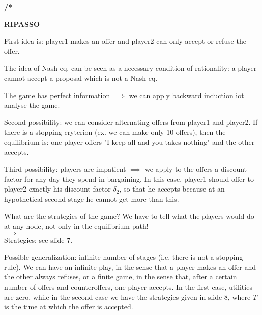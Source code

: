 
%



\bigskip
\noindent \textbf{/*}

\noindent \textbf{RIPASSO}

\noindent First idea is: player1 makes an offer and player2 can only accept or 
refuse the offer.

\noindent The idea of Nash eq. can be seen as a necessary condition of 
rationality: a player cannot accept a proposal which is not a Nash eq.

\noindent The game has perfect information $\implies$ we can apply backward 
induction iot analyse the game.

\noindent Second possibility: we can consider alternating offers from player1 
and player2. If there is a stopping cryterion (ex. we can make only 10 offers), 
then the equilibrium is: one player offers "I keep all and you takes nothing" 
and the other accepts.

\noindent Third possibility: players are impatient $\implies$ we apply to the 
offers a discount factor for any day they spend in bargaining. In this case, 
player1 should offer to player2 exactly his discount factor $\delta_2$, so that 
he accepts because at an hypothetical second stage he cannot get more than this.

\noindent What are the strategies of the game? We have to tell what the players 
would do at any node, not only in the equilibrium path!\\
$\implies$\\
Strategies: see slide 7.

\noindent Possible generalization: infinite number of stages (i.e. there is not 
a stopping rule). We can have an infinite play, in the sense that a player makes 
an offer and the other always refuses, or a finite game, in the sense that, 
after a certain number of offers and counteroffers, one player accepts. In 
the first case, utilities are zero, while in the second case we have the 
strategies given in slide 8, where $T$ is the time at which the offer is 
accepted.

